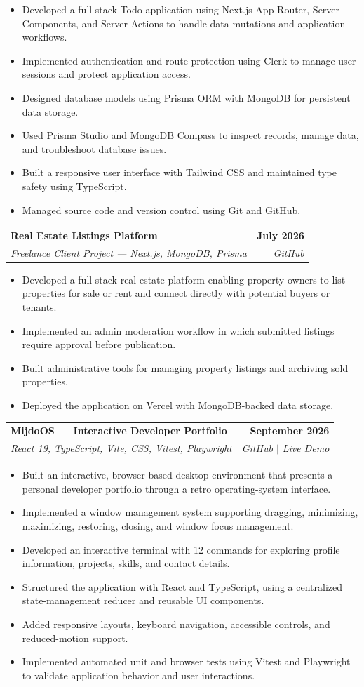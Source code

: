 \documentclass[letterpaper,11pt]{article}
\makeatletter
\newcommand{\resumeItem}[1]{
  \item\small{#1 \vspace{-2pt}}
}
\newcommand{\resumeSubheading}[4]{%
  \vspace{-2pt}\item
  \begin{tabular*}{1.0\textwidth}[t]{l@{\extracolsep{\fill}}r}
    \textbf{#1} & \textbf{\small #2} \\
    \textit{\small #3} & \textit{\small #4} \\
  \end{tabular*}\vspace{-7pt}
}
\newcommand{\resumeItemListStart}{
  \begin{itemize}
}
\newcommand{\resumeItemListEnd}{
  \end{itemize}\vspace{-5pt}
}
\makeatother
\begin{document}
    \resumeItemListStart
      \resumeItem{Developed a full-stack Todo application using Next.js App Router, Server Components, and Server Actions to handle data mutations and application workflows.}
      \resumeItem{Implemented authentication and route protection using Clerk to manage user sessions and protect application access.}
      \resumeItem{Designed database models using Prisma ORM with MongoDB for persistent data storage.}
      \resumeItem{Used Prisma Studio and MongoDB Compass to inspect records, manage data, and troubleshoot database issues.}
      \resumeItem{Built a responsive user interface with Tailwind CSS and maintained type safety using TypeScript.}
      \resumeItem{Managed source code and version control using Git and GitHub.}
    \resumeItemListEnd


  \resumeSubheading
    {Real Estate Listings Platform}{July 2026}
    {Freelance Client Project --- Next.js, MongoDB, Prisma}
    {\href{https://github.com/Mij-Do/real-state-full-stack-project}
    {\underline{GitHub}}}

    \resumeItemListStart
      \resumeItem{Developed a full-stack real estate platform enabling property owners to list properties for sale or rent and connect directly with potential buyers or tenants.}
      \resumeItem{Implemented an admin moderation workflow in which submitted listings require approval before publication.}
      \resumeItem{Built administrative tools for managing property listings and archiving sold properties.}
      \resumeItem{Deployed the application on Vercel with MongoDB-backed data storage.}
    \resumeItemListEnd


  \resumeSubheading
    {MijdoOS --- Interactive Developer Portfolio}{September 2026}
    {React 19, TypeScript, Vite, CSS, Vitest, Playwright}
    {\href{https://github.com/Mij-Do/mijdoOs}
    {\underline{GitHub}} $\vert$
    \href{https://mijdo-os.vercel.app/}
    {\underline{Live Demo}}}

    \resumeItemListStart
      \resumeItem{Built an interactive, browser-based desktop environment that presents a personal developer portfolio through a retro operating-system interface.}
      \resumeItem{Implemented a window management system supporting dragging, minimizing, maximizing, restoring, closing, and window focus management.}
      \resumeItem{Developed an interactive terminal with 12 commands for exploring profile information, projects, skills, and contact details.}
      \resumeItem{Structured the application with React and TypeScript, using a centralized state-management reducer and reusable UI components.}
      \resumeItem{Added responsive layouts, keyboard navigation, accessible controls, and reduced-motion support.}
      \resumeItem{Implemented automated unit and browser tests using Vitest and Playwright to validate application behavior and user interactions.}
    \resumeItemListEnd
\end{document}
